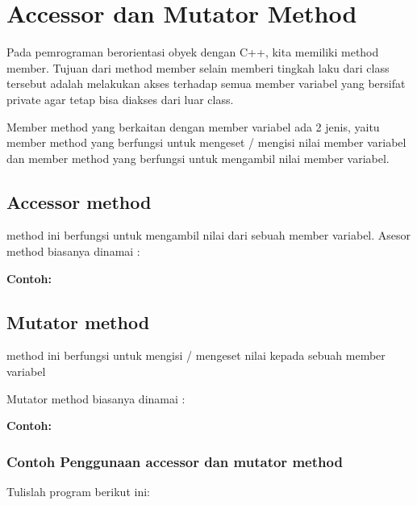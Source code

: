 \section{Accessor dan Mutator
Method}\label{accessor-dan-mutator-method}

Pada pemrograman berorientasi obyek dengan C++, kita memiliki method
member. Tujuan dari method member selain memberi tingkah laku dari class
tersebut adalah melakukan akses terhadap semua member variabel yang
bersifat private agar tetap bisa diakses dari luar class.

Member method yang berkaitan dengan member variabel ada 2 jenis, yaitu
member method yang berfungsi untuk mengeset / mengisi nilai member
variabel dan member method yang berfungsi untuk mengambil nilai member
variabel.

\subsection{Accessor method}\label{accessor-method}

method ini berfungsi untuk mengambil nilai dari sebuah member variabel.
Asesor method biasanya dinamai :



\textbf{Contoh:}



\subsection{Mutator method}\label{mutator-method}

method ini berfungsi untuk mengisi / mengeset nilai kepada sebuah member
variabel

Mutator method biasanya dinamai :



\textbf{Contoh:}



\subsubsection*{Contoh Penggunaan accessor dan mutator method}

Tulislah program berikut ini:



